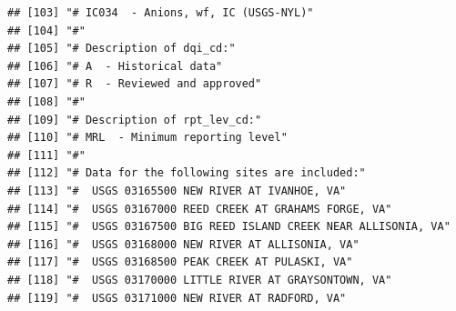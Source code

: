 \documentclass[
]{book}
\begin{document}
\begin{verbatim}
## [103] "# IC034  - Anions, wf, IC (USGS-NYL)"                                                                                                         
## [104] "#"                                                                                                                                            
## [105] "# Description of dqi_cd:"                                                                                                                     
## [106] "# A  - Historical data"                                                                                                                       
## [107] "# R  - Reviewed and approved"                                                                                                                 
## [108] "#"                                                                                                                                            
## [109] "# Description of rpt_lev_cd:"                                                                                                                 
## [110] "# MRL  - Minimum reporting level"                                                                                                             
## [111] "#"                                                                                                                                            
## [112] "# Data for the following sites are included:"                                                                                                 
## [113] "#  USGS 03165500 NEW RIVER AT IVANHOE, VA"                                                                                                    
## [114] "#  USGS 03167000 REED CREEK AT GRAHAMS FORGE, VA"                                                                                             
## [115] "#  USGS 03167500 BIG REED ISLAND CREEK NEAR ALLISONIA, VA"                                                                                    
## [116] "#  USGS 03168000 NEW RIVER AT ALLISONIA, VA"                                                                                                  
## [117] "#  USGS 03168500 PEAK CREEK AT PULASKI, VA"                                                                                                   
## [118] "#  USGS 03170000 LITTLE RIVER AT GRAYSONTOWN, VA"                                                                                             
## [119] "#  USGS 03171000 NEW RIVER AT RADFORD, VA"                                                                                                    

\end{verbatim}
\end{document}
